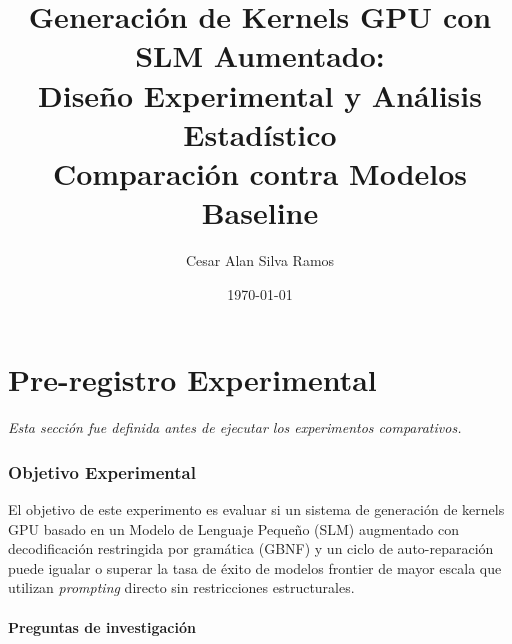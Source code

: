 \documentclass[12pt]{article}
\title{
  \textbf{Generación de Kernels GPU con SLM Aumentado:}\\
  \large Diseño Experimental y Análisis Estadístico\\[0.5em]
  \normalsize Comparación contra Modelos Baseline
}
\author{Cesar Alan Silva Ramos}
\date{\today}
\begin{document}
\maketitle
\tableofcontents
\newpage

\part{Pre-registro Experimental}
\textit{Esta sección fue definida antes de ejecutar los experimentos comparativos.}

\section{Objetivo Experimental}

El objetivo de este experimento es evaluar si un sistema de generación de kernels GPU
basado en un Modelo de Lenguaje Pequeño (SLM) augmentado con decodificación restringida
por gramática (GBNF) y un ciclo de auto-reparación puede igualar o superar la tasa de
éxito de modelos frontier de mayor escala que utilizan \textit{prompting} directo sin
restricciones estructurales.

\subsection*{Preguntas de investigación}
\end{document}
